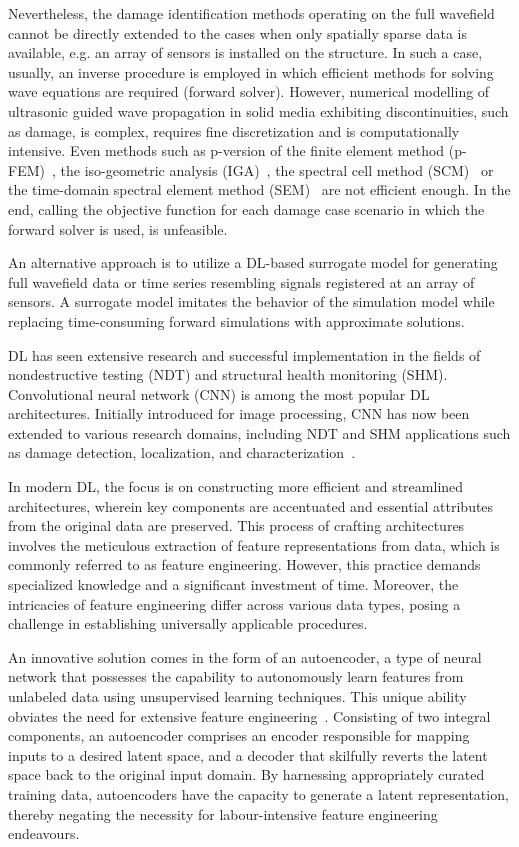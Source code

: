 Nevertheless, the damage identification methods operating on the full wavefield cannot be directly extended to the cases when only spatially sparse data is available, e.g. an array of sensors is installed on the structure.
In such a case, usually, an inverse procedure is employed in which efficient methods for solving wave equations are required (forward solver).  
However, numerical modelling of ultrasonic guided wave propagation in solid media exhibiting discontinuities, such as damage, is complex, requires fine discretization and is computationally intensive.
Even methods such as p-version of the finite element method (p-FEM)~\cite{Duczek2013}, the iso-geometric analysis (IGA)~\cite{Anitescu2019}, the spectral cell method (SCM)~\cite{Mossaiby2019} or the time-domain spectral element method (SEM)~\cite{Ostachowicz2012} are not efficient enough.
In the end, calling the objective function for each damage case scenario in which the forward solver is used, is unfeasible.

An alternative approach is to utilize a DL-based surrogate model for generating full wavefield data or time series resembling signals registered at an array of sensors. 
A surrogate model imitates the behavior of the simulation model while replacing time-consuming forward simulations with approximate solutions.

DL has seen extensive research and successful implementation in the fields of nondestructive testing (NDT) and structural health monitoring (SHM). 
Convolutional neural network (CNN) is among the most popular DL architectures. 
Initially introduced for image processing, CNN has now been extended to various research domains, including NDT and SHM applications such as damage detection, localization, and characterization~\cite{rautela2019deep, pandey2022explainable, ijjeh2021full, ijjeh2022deep}.

In modern DL, the focus is on constructing more efficient and streamlined architectures, wherein key components are accentuated and essential attributes from the original data are preserved. 
This process of crafting architectures involves the meticulous extraction of feature representations from data, which is commonly referred to as feature engineering. 
However, this practice demands specialized knowledge and a significant investment of time. 
Moreover, the intricacies of feature engineering differ across various data types, posing a challenge in establishing universally applicable procedures.

An innovative solution comes in the form of an autoencoder, a type of neural network that possesses the capability to autonomously learn features from unlabeled data using unsupervised learning techniques. 
This unique ability obviates the need for extensive feature engineering~\cite{pinaya2020autoencoders}. 
Consisting of two integral components, an autoencoder comprises an encoder responsible for mapping inputs to a desired latent space, and a decoder that skilfully reverts the latent space back to the original input domain. 
By harnessing appropriately curated training data, autoencoders have the capacity to generate a latent representation, thereby negating the necessity for labour-intensive feature engineering endeavours.

